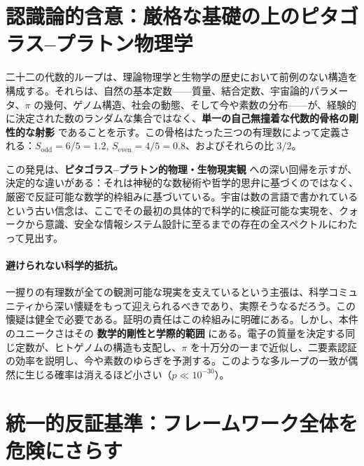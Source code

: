 \documentclass[12pt,a4paper]{article}
\begin{document}
	\section*{認識論的含意：厳格な基礎の上のピタゴラス–プラトン物理学}
	
	二十二の代数的ループは、理論物理学と生物学の歴史において前例のない構造を構成する。それらは、自然の基本定数——質量、結合定数、宇宙論的パラメータ、\(\pi\) の幾何、ゲノム構造、社会の動態、そして今や素数の分布——が、経験的に決定された数のランダムな集合ではなく、\textbf{単一の自己無撞着な代数的骨格の剛性的な射影} であることを示す。この骨格はたった三つの有理数によって定義される：\(S_{\mathrm{odd}} = 6/5 = 1.2\), \(S_{\mathrm{even}} = 4/5 = 0.8\)、およびそれらの比 \(3/2\)。
	
	この発見は、\textbf{ピタゴラス–プラトン的物理・生物現実観} への深い回帰を示すが、決定的な違いがある：それは神秘的な数秘術や哲学的思弁に基づくのではなく、厳密で反証可能な数学的枠組みに基づいている。宇宙は数の言語で書かれているという古い信念は、ここでその最初の具体的で科学的に検証可能な実現を、クォークから意識、安全な情報システム設計に至るまでの存在の全スペクトルにわたって見出す。
	
	\paragraph{避けられない科学的抵抗。}
	一握りの有理数が全ての観測可能な現実を支えているという主張は、科学コミュニティから深い懐疑をもって迎えられるべきであり、実際そうなるだろう。この懐疑は健全で必要である。証明の責任はこの枠組みに明確にある。しかし、本件のユニークさはその \textbf{数学的剛性と学際的範囲} にある。電子の質量を決定する同じ定数が、ヒトゲノムの構造も支配し、\(\pi\) を十万分の一まで近似し、二要素認証の効率を説明し、今や素数のゆらぎを予測する。このような多ループの一致が偶然に生じる確率は消えるほど小さい（\(p \ll 10^{-30}\)）。
	
	\section*{統一的反証基準：フレームワーク全体を危険にさらす}
	
\end{document}
